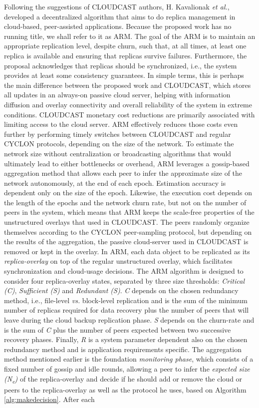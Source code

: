 \documentclass[runningheads]{llncs}
\begin{document}
Following the suggestions of CLOUDCAST authors, H. Kavalionak \textit{et al.}, developed a decentralized algorithm \cite{marriage_of_convinience} that aims to do replica management in cloud-based, peer-assisted applications. Because the proposed work has no running title, we shall refer to it as ARM. The goal of the ARM is to maintain an appropriate replication level, despite churn, such that, at all times, at least one replica is available and ensuring that replicas survive failures. Furthermore, the proposal acknowledges that replicas should be synchronized, i.e., the system provides at least some consistency guarantees. In simple terms, this is perhaps the main difference between the proposed work and CLOUDCAST, which stores all updates in an always-on passive cloud server, helping with information diffusion and overlay connectivity and overall reliability of the system in extreme conditions. CLOUDCAST monetary cost reductions are primarily associated with limiting access to the cloud server. ARM effectively reduces those costs even further by performing timely switches between CLOUDCAST and regular CYCLON protocols, depending on the size of the network. To estimate the network size without centralization or broadcasting algorithms that would ultimately lead to either bottlenecks or overhead, ARM leverages a gossip-based aggregation method \cite{gossip-based_aggregation} that allows each peer to infer the approximate size of the network autonomously, at the end of each epoch. Estimation accuracy is dependent only on the size of the epoch. Likewise, the execution cost depends on the length of the epochs and the network churn rate, but not on the number of peers in the system, which means that ARM keeps the scale-free properties of the unstructured overlays that used in CLOUDCAST. The peers randomly organize themselves according to the CYCLON peer-sampling protocol, but depending on the results of the aggregation, the passive cloud-server used in CLOUDCAST is removed or kept in the overlay. In ARM, each data object to be replicated as its \textit{replica-overlay} on top of the regular unstructured overlay, which facilitates synchronization and cloud-usage decisions. The ARM algorithm is designed to consider four replica-overlay states, separated by three size thresholds: \textit{Critical (C)}, \textit{Sufficient (S)} and \textit{Redundant (S)}. \textit{C} depends on the chosen redundancy method, i.e., file-level \textit{vs.} block-level replication and is the sum of the minimum number of replicas required for data recovery plus the number of peers that will leave during the cloud backup replication phase. \textit{S} depends on the churn-rate and is the sum of \textit{C} plus the number of peers expected between two successive recovery phases. Finally, \textit{R} is a system parameter dependent also on the chosen redundancy method and is application requirements specific.  The aggregation method mentioned earlier is the foundation \textit{monitoring phase}, which consists of a fixed number of gossip and idle rounds, allowing a peer to infer the \textit{expected size (N\textsubscript{e})} of the replica-overlay and decide if he should add or remove the cloud or peers to the replica-overlay as well as the protocol he uses, based on Algorithm \ref{alg:makedecision}. After each 
\end{document}

